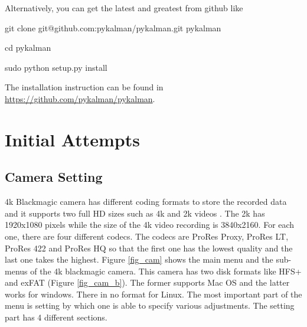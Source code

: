\documentclass[[12pt,DIV14,BCOR12mm,a4paper,footexclude,headinclude,halfparskip-,twoside,openright,cleardoubleempty,idxtotoc,bibtotoc]{article}
\begin{document}
Alternatively, you can get the latest and greatest from github like 

 \begin{framed}

git clone git@github.com:pykalman/pykalman.git pykalman

cd pykalman

 sudo python setup.py install

\end{framed} 

The installation instruction can be found in \url{https://github.com/pykalman/pykalman}.


\section{Initial Attempts}

\subsection{Camera Setting}

4k Blackmagic camera has different coding formats to store the recorded data and it supports two full HD sizes such as 4k and 2k videos . The 2k has 1920x1080 pixels while the size of the 4k video recording is 3840x2160. For each one, there are four different codecs. The codecs are ProRes Proxy, ProRes LT, ProRes 422 and ProRes HQ so that the first one has the lowest quality and the last one takes the highest. Figure \ref{fig_cam} shows the main menu and the sub-menus of the 4k blackmagic camera. This camera has two  disk formats like HFS+ and exFAT (Figure \ref{fig_cam_b}). The former supports Mac OS and the latter works for windows. There in no format for Linux. The most important part of the menu is setting by which one is able to specify various adjustments. The setting part has 4 different sections.  
\end{document}
